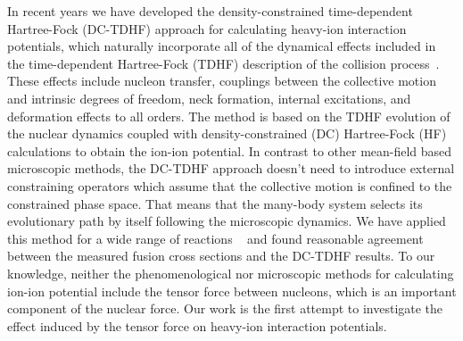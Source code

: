 \documentclass[aps,prc,twocolumn,showpacs,superscriptaddress,longbibliography,nofootinbib,floatfix,10pt]{revtex4-1}
\begin{document}
In recent years we have developed the density-constrained time-dependent Hartree-Fock (DC-TDHF) approach for calculating heavy-ion interaction
potentials, which naturally incorporate all of the dynamical effects included in the time-dependent Hartree-Fock (TDHF) description of the collision process~\cite{Umar2006_PRC74-021601}.
These effects include nucleon transfer, couplings between the collective motion and intrinsic degrees of freedom, neck formation, internal excitations, and deformation effects to all orders.
The method is based on the TDHF evolution of the nuclear dynamics coupled with density-constrained (DC) Hartree-Fock (HF) calculations to obtain the ion-ion potential.
In contrast to other mean-field based microscopic methods, the DC-TDHF approach doesn't need
to introduce external constraining operators which assume that the collective motion is confined to the constrained phase space. That means that the many-body system
selects its evolutionary path by itself following the microscopic dynamics. We have applied this method for a wide range of reactions ~\cite{Umar2006_PRC74-024606,Umar2006_PRC74-061601,Umar2008_PRC77-064605,Umar2008_EPJA37-245, Umar2009_PRC80-041601,Oberacker2010_PRC82-034603,Keser2012_PRC85-044606,Umar2012_PRC85-055801,
Umar2014_PRC89-034611,Godbey2017_PRC95-011601} and found reasonable agreement between the measured fusion cross sections and the DC-TDHF results.
To our knowledge, neither the phenomenological nor microscopic methods for calculating ion-ion potential include the tensor
force between nucleons, which is an important component of the nuclear force. Our work is the first attempt to investigate the effect induced by the tensor
force on heavy-ion interaction potentials.
\end{document}
